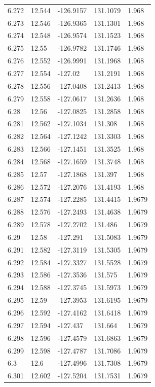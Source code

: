 \begin{tabular}{lllll}
6.272 & 12.544 & -126.9157 & 131.1079 & 1.968 \\
6.273 & 12.546 & -126.9365 & 131.1301 & 1.968 \\
6.274 & 12.548 & -126.9574 & 131.1523 & 1.968 \\
6.275 & 12.55 & -126.9782 & 131.1746 & 1.968 \\
6.276 & 12.552 & -126.9991 & 131.1968 & 1.968 \\
6.277 & 12.554 & -127.02 & 131.2191 & 1.968 \\
6.278 & 12.556 & -127.0408 & 131.2413 & 1.968 \\
6.279 & 12.558 & -127.0617 & 131.2636 & 1.968 \\
6.28 & 12.56 & -127.0825 & 131.2858 & 1.968 \\
6.281 & 12.562 & -127.1034 & 131.308 & 1.968 \\
6.282 & 12.564 & -127.1242 & 131.3303 & 1.968 \\
6.283 & 12.566 & -127.1451 & 131.3525 & 1.968 \\
6.284 & 12.568 & -127.1659 & 131.3748 & 1.968 \\
6.285 & 12.57 & -127.1868 & 131.397 & 1.968 \\
6.286 & 12.572 & -127.2076 & 131.4193 & 1.968 \\
6.287 & 12.574 & -127.2285 & 131.4415 & 1.9679 \\
6.288 & 12.576 & -127.2493 & 131.4638 & 1.9679 \\
6.289 & 12.578 & -127.2702 & 131.486 & 1.9679 \\
6.29 & 12.58 & -127.291 & 131.5083 & 1.9679 \\
6.291 & 12.582 & -127.3119 & 131.5305 & 1.9679 \\
6.292 & 12.584 & -127.3327 & 131.5528 & 1.9679 \\
6.293 & 12.586 & -127.3536 & 131.575 & 1.9679 \\
6.294 & 12.588 & -127.3745 & 131.5973 & 1.9679 \\
6.295 & 12.59 & -127.3953 & 131.6195 & 1.9679 \\
6.296 & 12.592 & -127.4162 & 131.6418 & 1.9679 \\
6.297 & 12.594 & -127.437 & 131.664 & 1.9679 \\
6.298 & 12.596 & -127.4579 & 131.6863 & 1.9679 \\
6.299 & 12.598 & -127.4787 & 131.7086 & 1.9679 \\
6.3 & 12.6 & -127.4996 & 131.7308 & 1.9679 \\
6.301 & 12.602 & -127.5204 & 131.7531 & 1.9679 \\

\end{tabular}
